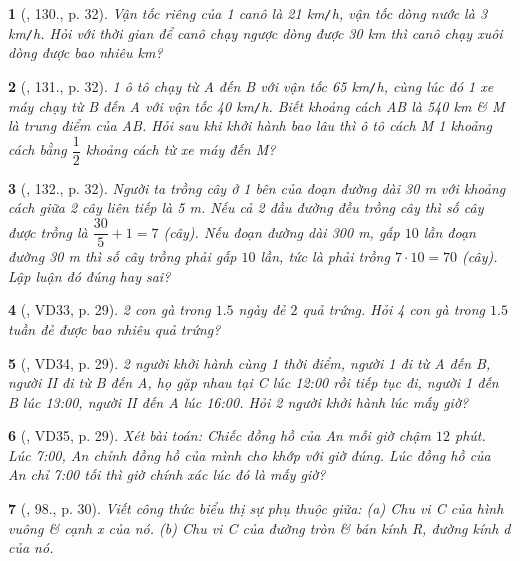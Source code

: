 \documentclass{article}
\newtheorem{baitoan}{}
\begin{document}
\begin{baitoan}[\cite{Tuyen_Toan_7}, 130., p. 32]
	Vận tốc riêng của 1 canô là {\rm21 km{\tt/}h}, vận tốc dòng nước là {\rm3 km{\tt/}h}. Hỏi với thời gian để canô chạy ngược dòng được {\rm30 km} thì canô chạy xuôi dòng được bao nhiêu {\rm km}?
\end{baitoan}

\begin{baitoan}[\cite{Tuyen_Toan_7}, 131., p. 32]
	1 ô tô chạy từ A đến B với vận tốc {\rm65 km{\tt/}h}, cùng lúc đó 1 xe máy chạy từ B đến A với vận tốc {\rm40 km{\tt/}h}. Biết khoảng cách AB là {\rm540 km} \& M là trung điểm của AB. Hỏi sau khi khởi hành bao lâu thì ô tô cách M 1 khoảng cách bằng $\dfrac{1}{2}$ khoảng cách từ xe máy đến M?
\end{baitoan}

\begin{baitoan}[\cite{Tuyen_Toan_7}, 132., p. 32]
	Người ta trồng cây ở 1 bên của đoạn đường dài {\rm30 m} với khoảng cách giữa 2 cây liên tiếp là {\rm5 m}. Nếu cả 2 đầu đường đều trồng cây thì số cây được trồng là $\dfrac{30}{5} + 1 = 7$ (cây). Nếu đoạn đường dài {\rm300 m}, gấp $10$ lần đoạn đường {\rm30 m} thì số cây trồng phải gấp $10$ lần, tức là phải trồng $7\cdot 10 = 70$ (cây). Lập luận đó đúng hay sai?
\end{baitoan}

\begin{baitoan}[\cite{Binh_Toan_7_tap_1}, VD33, p. 29]
	2 con gà trong $1.5$ ngày đẻ $2$ quả trứng. Hỏi 4 con gà trong $1.5$ tuần đẻ được bao nhiêu quả trứng?
\end{baitoan}

\begin{baitoan}[\cite{Binh_Toan_7_tap_1}, VD34, p. 29]
	2 người khởi hành cùng 1 thời điểm, người 1 đi từ A đến B, người II đi từ B đến A, họ gặp nhau tại C lúc {\rm12:00} rồi tiếp tục đi, người 1 đến B lúc {\rm13:00}, người II đến A lúc {\rm16:00}. Hỏi 2 người khởi hành lúc mấy giờ?
\end{baitoan}

\begin{baitoan}[\cite{Binh_Toan_7_tap_1}, VD35, p. 29]
	Xét bài toán: Chiếc đồng hồ của An mỗi giờ chậm $12$ phút. Lúc {\rm7:00}, An chỉnh đồng hồ của mình cho khớp với giờ đúng. Lúc đồng hồ của An chỉ {\rm7:00} tối thì giờ chính xác lúc đó là mấy giờ? 
\end{baitoan}

\begin{baitoan}[\cite{Binh_Toan_7_tap_1}, 98., p. 30]
	Viết công thức biểu thị sự phụ thuộc giữa: (a) Chu vi C của hình vuông \& cạnh x của nó. (b) Chu vi C của đường tròn \& bán kính R, đường kính d của nó.
\end{baitoan}
\end{document}
